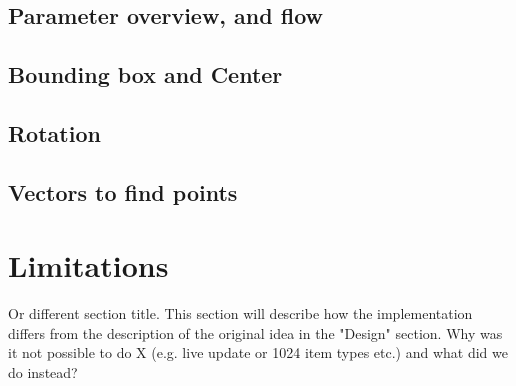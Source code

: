 \subsection{Parameter overview, and flow }
\subsection{Bounding box and Center}
\subsection{Rotation}
\subsection{Vectors to find points}


\section{Limitations}
Or different section title. This section will describe how the implementation differs from the description of the original idea in the "Design" section. Why was it not possible to do X (e.g. live update or 1024 item types etc.) and what did we do instead?